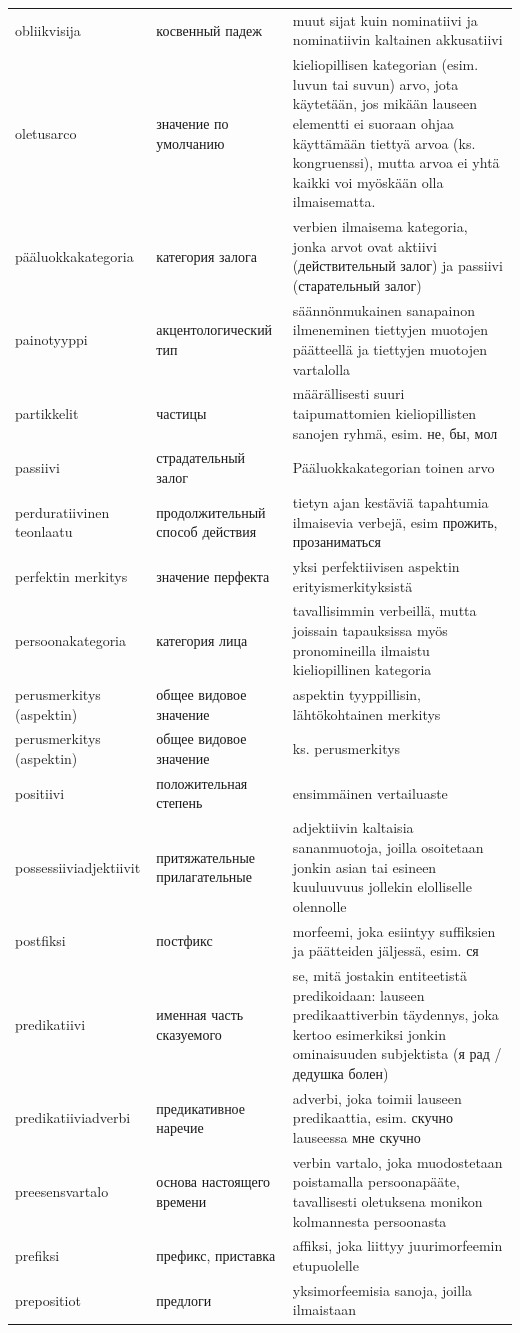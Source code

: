 \documentclass[]{scrreprt}
\begin{document}
\begin{longtable}[c]{p{4cm}p{4cm}p{7cm}}
obliikvisija & косвенный падеж & muut sijat kuin nominatiivi ja
nominatiivin kaltainen akkusatiivi\tabularnewline
oletusarco & значение по умолчанию & kieliopillisen kategorian (esim.
luvun tai suvun) arvo, jota käytetään, jos mikään lauseen elementti ei
suoraan ohjaa käyttämään tiettyä arvoa (ks. kongruenssi), mutta arvoa ei
yhtä kaikki voi myöskään olla ilmaisematta.\tabularnewline
pääluokkakategoria & категория залога & verbien ilmaisema kategoria,
jonka arvot ovat aktiivi (действительный залог) ja passiivi
(старательный залог)\tabularnewline
painotyyppi & акцентологический тип & säännönmukainen sanapainon
ilmeneminen tiettyjen muotojen päätteellä ja tiettyjen muotojen
vartalolla\tabularnewline
partikkelit & частицы & määrällisesti suuri taipumattomien
kieliopillisten sanojen ryhmä, esim. не, бы, мол\tabularnewline
passiivi & страдательный залог & Pääluokkakategorian toinen
arvo\tabularnewline
perduratiivinen teonlaatu & продолжительный способ действия & tietyn
ajan kestäviä tapahtumia ilmaisevia verbejä, esim прожить,
прозаниматься\tabularnewline
perfektin merkitys & значение перфекта & yksi perfektiivisen aspektin
erityismerkityksistä\tabularnewline
persoonakategoria & категория лица & tavallisimmin verbeillä, mutta
joissain tapauksissa myös pronomineilla ilmaistu kieliopillinen
kategoria\tabularnewline
perusmerkitys (aspektin) & общее видовое значение & aspektin
tyyppillisin, lähtökohtainen merkitys\tabularnewline
perusmerkitys (aspektin) & общее видовое значение & ks.
perusmerkitys\tabularnewline
positiivi & положительная степень & ensimmäinen
vertailuaste\tabularnewline
possessiiviadjektiivit & притяжательные прилагательные & adjektiivin
kaltaisia sananmuotoja, joilla osoitetaan jonkin asian tai esineen
kuuluuvuus jollekin elolliselle olennolle\tabularnewline
postfiksi & постфикс & morfeemi, joka esiintyy suffiksien ja päätteiden
jäljessä, esim. ся\tabularnewline
predikatiivi & именная часть сказуемого & se, mitä jostakin entiteetistä
predikoidaan: lauseen predikaattiverbin täydennys, joka kertoo
esimerkiksi jonkin ominaisuuden subjektista (я рад / дедушка
болен)\tabularnewline
predikatiiviadverbi & предикативное наречие & adverbi, joka toimii
lauseen predikaattia, esim. скучно lauseessa мне скучно\tabularnewline
preesensvartalo & основа настоящего времени & verbin vartalo, joka
muodostetaan poistamalla persoonapääte, tavallisesti oletuksena monikon
kolmannesta persoonasta\tabularnewline
prefiksi & префикс, приставка & affiksi, joka liittyy juurimorfeemin
etupuolelle\tabularnewline
prepositiot & предлоги & yksimorfeemisia sanoja, joilla ilmaistaan

\end{longtable}
\end{document}
